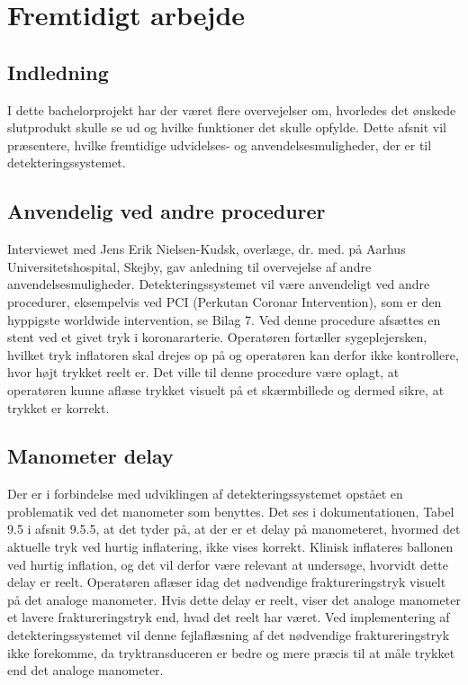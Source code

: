 \chapter{Fremtidigt arbejde}


\section*{Indledning}
I dette bachelorprojekt har der været flere overvejelser om, hvorledes det ønskede slutprodukt skulle se ud og hvilke funktioner det skulle opfylde. Dette afsnit vil præsentere, hvilke fremtidige udvidelses- og anvendelsesmuligheder, der er til detekteringssystemet.     
   
\section{Anvendelig ved andre procedurer}
Interviewet med Jens Erik Nielsen-Kudsk, overlæge, dr. med. på Aarhus Universitetshospital, Skejby, gav anledning til overvejelse af andre anvendelsesmuligheder. Detekteringssystemet vil være anvendeligt ved andre procedurer, eksempelvis ved PCI (Perkutan Coronar Intervention), som er den hyppigste worldwide intervention, se Bilag 7. Ved denne procedure afsættes en stent ved et givet tryk i koronararterie. Operatøren fortæller sygeplejersken, hvilket tryk inflatoren skal drejes op på og operatøren kan derfor ikke kontrollere, hvor højt trykket reelt er. Det ville til denne procedure være oplagt, at operatøren kunne aflæse trykket visuelt på et skærmbillede og dermed sikre, at trykket er korrekt.  

\section{Manometer delay}
Der er i forbindelse med udviklingen af detekteringssystemet opstået en problematik ved det manometer som benyttes. Det ses i dokumentationen, Tabel 9.5 i afsnit 9.5.5, at det tyder på, at der er et delay på manometeret, hvormed det aktuelle tryk ved hurtig inflatering, ikke vises korrekt. Klinisk inflateres ballonen ved hurtig inflation, og det vil derfor være relevant at undersøge, hvorvidt dette delay er reelt. Operatøren aflæser idag det nødvendige fraktureringstryk visuelt på det analoge manometer. Hvis dette delay er reelt, viser det analoge manometer et lavere fraktureringstryk end, hvad det reelt har været. Ved implementering af detekteringssystemet vil denne fejlaflæsning af det nødvendige fraktureringstryk ikke forekomme, da tryktransduceren er bedre og mere præcis til at måle trykket end det analoge manometer. 
 
